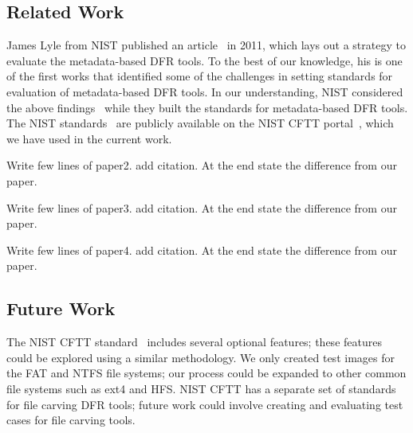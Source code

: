 \subsection{Related Work} \label{sec:discussion:subsec:related}

James Lyle from NIST published an article~\cite{lyle2011-ICDF2C} in 2011, which lays out a strategy to evaluate the metadata-based DFR tools. To the best of our knowledge, 
his is one of the first works that identified some of the challenges in setting standards for evaluation of metadata-based DFR tools.
In our understanding, NIST considered the above findings~\cite{lyle2011-ICDF2C} while they built the standards for metadata-based DFR tools.  
The NIST standards~\cite{meta:dfr:standards} are publicly available on the NIST CFTT portal~\cite{cftt:nist}, which we have used in the current work.

Write few lines of paper2. add citation. At the end state the difference from our paper.

Write few lines of paper3. add citation. At the end state the difference from our paper.

Write few lines of paper4. add citation. At the end state the difference from our paper.

\subsection{Future Work}
The NIST CFTT standard~\cite{meta:dfr:standards} includes several optional features; these features could be explored using a similar methodology.
We only created test images for the FAT and NTFS file systems; our process could be expanded to other common file systems such as ext4 and HFS.
NIST CFTT has a separate set of standards for file carving DFR tools; future work could involve creating and evaluating test cases for file carving tools.
